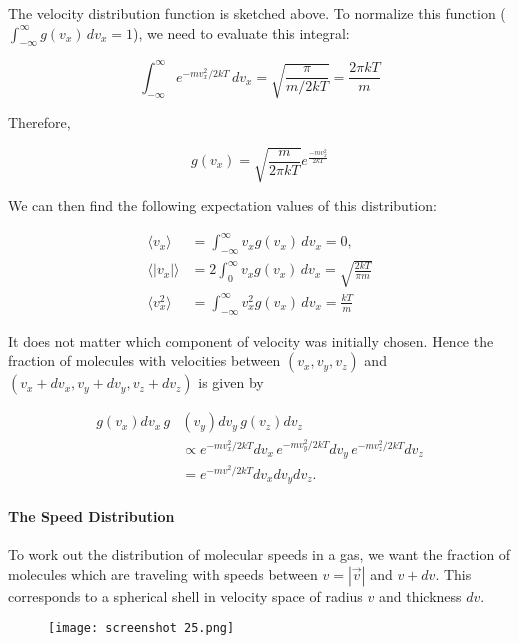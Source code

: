 \documentclass[svgnames]{article}     %
\begin{document}
The velocity distribution function is sketched above. To normalize this
function ($\int_{-\infty}^{\infty} g(v_x) \, dv_x = 1$), we need to
evaluate this integral: 

\[
  \int_{-\infty}^{\infty} e^{-mv_x^2 / 2kT} \, dv_x = \sqrt{\frac{\pi}{m/2kT}}
  = \frac{2\pi kT}{m}
\] \vspace{5px}

Therefore, 

\[
  g(v_x) = \sqrt{\frac{m}{2\pi kT}} e^{\frac{-mv_x^2}{2kT}}
\] \vspace{5px}

We can then find the following expectation values of this distribution: 

\begin{align*}
  \langle v_x \rangle &= \int_{-\infty}^{\infty} v_x g(v_x) \, dv_x = 0, \\
  \langle |v_x| \rangle &= 2\int_0^\infty v_x g(v_x) \, dv_x
  = \sqrt{\frac{2kT}{\pi m}} \\
  \langle v_x^2 \rangle &= \int_{-\infty}^{\infty} v_x^2 g(v_x) \, dv_x
  = \frac{kT}{m}
\end{align*}
\vspace{5px} 

It does not matter which component of velocity was initially chosen. Hence the
fraction of molecules with velocities between $(v_x, v_y, v_z)$ and $(v_x
+ dv_x, v_y + dv_y, v_z + dv_z)$ is given by

\begin{align*}
  g(v_x)dv_x \, g&(v_y)dv_y \, g(v_z)dv_z \\ 
                 &\propto e^{-mv_x^2 / 2kT} dv_x \, e^{-mv_y^2 / 2kT} dv_y \,
                 e^{-mv_z^2 / 2kT} dv_z \\
                 &= e^{-mv^2 / 2kT} dv_x dv_y dv_z. 
\end{align*}
\vspace{5px}

\paragraph{The Speed Distribution}

To work out the distribution of molecular speeds in a gas, we want the fraction
of molecules which are traveling with speeds between $v = |\vec{v}|$ and $v
+ dv$. This corresponds to a spherical shell in velocity space of radius $v$
and thickness $dv$. 

\begin{figure}[H]
  \centering
    \texttt{[image: screenshot 25.png]}
\end{figure}
\end{document}
